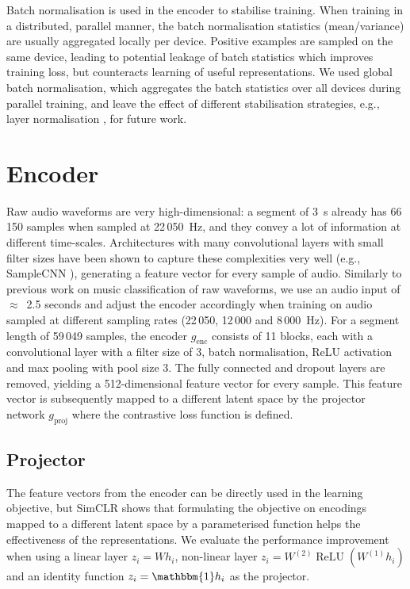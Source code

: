 \documentclass{report}
\DeclareRobustCommand{\diffword}[1]{{\sethlcolor{orange}\hl{#1}}}
\begin{document}
Batch normalisation\cite{batch_normalisation} is used in the encoder to stabilise training. When training in a distributed, parallel manner, the batch normalisation statistics (mean/variance) are usually aggregated locally per device. Positive examples are sampled on the same device, leading to potential leakage of batch statistics which improves training loss, but counteracts learning of useful representations. We used global batch normalisation, which aggregates the batch statistics over all devices during parallel training, and leave the effect of different stabilisation strategies, e.g., layer normalisation \cite{henaff2019data}, for future work.


\section{Encoder}
Raw audio waveforms are very high-dimensional: a segment of 3~s already has 66\,150 samples when sampled at 22\,050~Hz, and they convey a lot of information at different time-scales. Architectures with many convolutional layers with small filter sizes have been shown to capture these complexities very well (e.g., SampleCNN \cite{lee2018samplecnn}), generating a feature vector for every sample of audio. Similarly to previous work on music classification of raw waveforms, we use an audio input of $\approx$~2.5 seconds\cite{dieleman2014end,lee2018samplecnn,pons_end--end_2017} and adjust the encoder accordingly when training on audio sampled at different sampling rates (22\,050, 12\,000 and 8\,000~Hz). For a segment length of 59\,049 samples, the encoder $g_{\mathrm{enc}}$ consists of 11 blocks, each with a convolutional layer with a filter size of 3, batch normalisation, ReLU activation and max pooling with pool size 3. The fully connected and dropout layers are removed, yielding a 512-dimensional feature vector for every sample. This feature vector is subsequently mapped to a different latent space by the projector network $g_{\mathrm{proj}}$ where the contrastive loss function is defined.

\subsection{Projector}
The feature vectors from the encoder can be directly used in the learning objective, but SimCLR\cite{chen_simple_2020} shows that formulating the objective on encodings mapped to a different latent space by a parameterised function helps the effectiveness of the representations. We evaluate the performance improvement when using a linear layer $z_i = Wh_i$, non-linear layer $z_i = W^{(2)}\operatorname{ReLU}(W^{(1)}h_i)$ and an identity function $z_i = \mathbbm{1}h_i$ as the projector.
\end{document}
